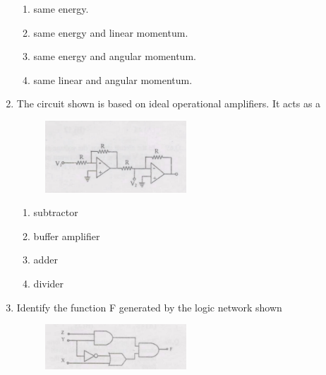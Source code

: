 \documentclass[journal,12pt,onecolumn]{IEEEtran}
\begin{document}
\begin{enumerate}[itemsep = 1em]
\begin{enumerate}
    \item same energy.
    \item same energy and linear momentum.
    \item same energy and angular momentum.
    \item same linear and angular momentum.
\end{enumerate}


\vspace{13em}

\item The circuit shown is based on ideal operational amplifiers. It acts as a 

\hfill{}

\begin{figure}[ht!]
    \centering
    \includegraphics[width=0.5\textwidth]{fig5.jpeg}
    \caption{}
    \label{fig:fig5.jpeg}
\end{figure}

\begin{multicols}{4}
\begin{enumerate}
    \item subtractor
    \item buffer amplifier
    \item adder
    \item divider
\end{enumerate} 
\end{multicols}

\item Identify the function F generated by the logic network shown

\hfill{}

\begin{figure}[ht!]
    \centering
    \includegraphics[width=0.5\textwidth]{fig6.jpeg}
    \caption{}
    \label{fig:fig6.jpeg}
\end{figure}


\end{enumerate}
\end{document}
